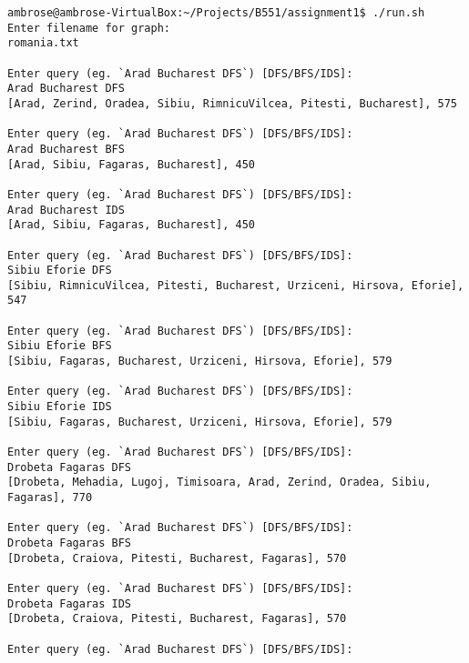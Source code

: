 \documentclass[10pt]{article}
\begin{document}
\begin{verbatim}
ambrose@ambrose-VirtualBox:~/Projects/B551/assignment1$ ./run.sh
Enter filename for graph:
romania.txt

Enter query (eg. `Arad Bucharest DFS`) [DFS/BFS/IDS]:
Arad Bucharest DFS
[Arad, Zerind, Oradea, Sibiu, RimnicuVilcea, Pitesti, Bucharest], 575

Enter query (eg. `Arad Bucharest DFS`) [DFS/BFS/IDS]:
Arad Bucharest BFS
[Arad, Sibiu, Fagaras, Bucharest], 450

Enter query (eg. `Arad Bucharest DFS`) [DFS/BFS/IDS]:
Arad Bucharest IDS
[Arad, Sibiu, Fagaras, Bucharest], 450

Enter query (eg. `Arad Bucharest DFS`) [DFS/BFS/IDS]:
Sibiu Eforie DFS
[Sibiu, RimnicuVilcea, Pitesti, Bucharest, Urziceni, Hirsova, Eforie], 547

Enter query (eg. `Arad Bucharest DFS`) [DFS/BFS/IDS]:
Sibiu Eforie BFS
[Sibiu, Fagaras, Bucharest, Urziceni, Hirsova, Eforie], 579

Enter query (eg. `Arad Bucharest DFS`) [DFS/BFS/IDS]:
Sibiu Eforie IDS
[Sibiu, Fagaras, Bucharest, Urziceni, Hirsova, Eforie], 579

Enter query (eg. `Arad Bucharest DFS`) [DFS/BFS/IDS]:
Drobeta Fagaras DFS
[Drobeta, Mehadia, Lugoj, Timisoara, Arad, Zerind, Oradea, Sibiu, Fagaras], 770

Enter query (eg. `Arad Bucharest DFS`) [DFS/BFS/IDS]:
Drobeta Fagaras BFS
[Drobeta, Craiova, Pitesti, Bucharest, Fagaras], 570

Enter query (eg. `Arad Bucharest DFS`) [DFS/BFS/IDS]:
Drobeta Fagaras IDS
[Drobeta, Craiova, Pitesti, Bucharest, Fagaras], 570

Enter query (eg. `Arad Bucharest DFS`) [DFS/BFS/IDS]:

\end{verbatim}
\end{document}
